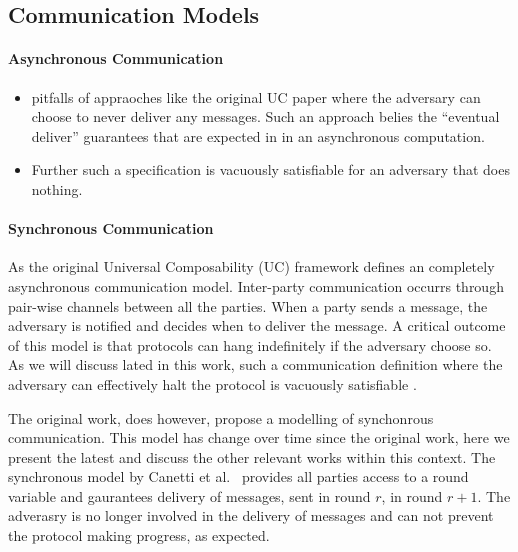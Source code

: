 \subsection{Communication Models}

\paragraph{Asynchronous Communication}
\begin{itemize}
\item pitfalls of appraoches like the original UC paper where the adversary can choose to never deliver any messages. Such an approach belies the ``eventual deliver'' guarantees that are expected in in an asynchronous computation.
\item Further such a specification is vacuously satisfiable for an adversary that does nothing.
\end{itemize}

\paragraph{Synchronous Communication} As the original Universal Composability (UC) framework defines an completely asynchronous communication model.
Inter-party communication occurrs through pair-wise channels between all the parties.
When a party sends a message, the adversary is notified and decides when to deliver the message.
A critical outcome of this model is that protocols can hang indefinitely if the adversary choose so.
As we will discuss lated in this work, such a communication definition where the adversary can effectively halt the protocol is vacuously satisfiable .

The original work, does however, propose a modelling of synchonrous communication.
This model has change over time since the original work, here we present the latest and discuss the other relevant works within this context.
The synchronous model by Canetti et al.~\cite{uc} provides all parties access to a round variable and gaurantees delivery of messages, sent in round $r$, in round $r+1$.
The adverasry is no longer involved in the delivery of messages and can not prevent the protocol making progress, as expected.

